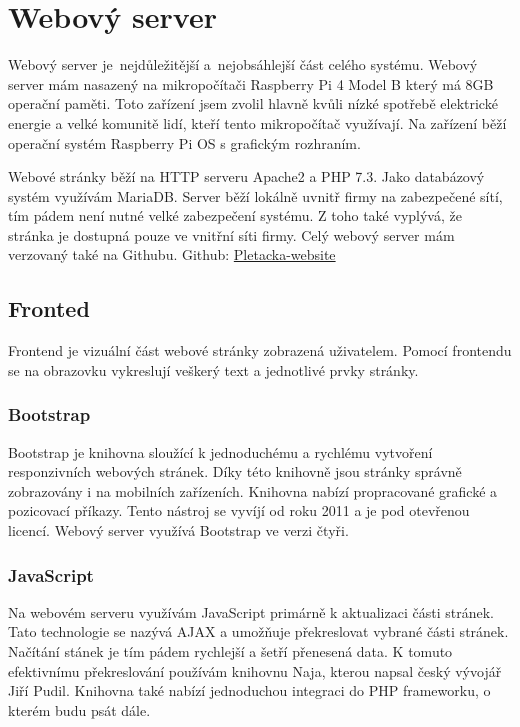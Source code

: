 \chapter{Webový server}
Webový server je~nejdůležitější a~nejobsáhlejší část celého systému. 
Webový server mám nasazený na mikropočítači Raspberry Pi 4 Model B který má 8GB operační paměti.
Toto zařízení jsem zvolil hlavně kvůli nízké spotřebě elektrické energie a velké komunitě lidí, kteří tento mikropočítač využívají.
Na zařízení běží operační systém Raspberry Pi OS s grafickým rozhraním.

Webové stránky běží na HTTP serveru Apache2 a PHP 7.3.
Jako databázový systém využívám MariaDB.
Server běží lokálně uvnitř firmy na zabezpečené sítí, tím pádem není nutné velké zabezpečení systému.
Z toho také vyplývá, že stránka je dostupná pouze ve vnitřní síti firmy.  
Celý webový server mám verzovaný také na Githubu.\newline
Github: \href{https://github.com/Pletacka-IoT/Pletacka-website}{Pletacka-website} 

\section{Fronted}
 
Frontend je vizuální část webové stránky zobrazená uživatelem.
Pomocí frontendu se na obrazovku vykreslují veškerý text a jednotlivé prvky stránky.

\subsection{Bootstrap}
Bootstrap je knihovna sloužící k jednoduchému a rychlému vytvoření responzivních webových stránek.
Díky této knihovně jsou stránky správně zobrazovány i na mobilních zařízeních.
Knihovna nabízí propracované grafické a pozicovací příkazy.
Tento nástroj se vyvíjí od roku 2011 a je pod otevřenou licencí.
Webový server využívá Bootstrap ve verzi čtyři.


\subsection{JavaScript}
Na webovém serveru využívám JavaScript primárně k aktualizaci části stránek.
Tato technologie se nazývá AJAX a umožňuje překreslovat vybrané části stránek.
Načítání stánek je tím pádem rychlejší a šetří přenesená data.
K tomuto efektivnímu překreslování používám knihovnu Naja\cite{NAJA}, kterou napsal český vývojář Jiří Pudil.
Knihovna také nabízí jednoduchou integraci do PHP frameworku, o kterém budu psát dále.   



